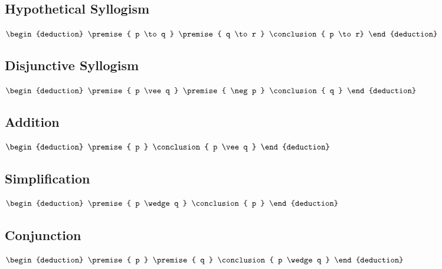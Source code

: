 \documentclass[12pt letter]{report}
\begin{document}
\subsection{Hypothetical Syllogism}

\begin{math}
  \begin{deduction}
    \premise{ p \to q }
    \premise{ q \to r }
    \conclusion{ p \to  r}
  \end{deduction}
\end{math}


\subsection{Disjunctive Syllogism}
\begin{math}
  \begin{deduction}
    \premise{ p \vee q }
    \premise{ \neg  p }
    \conclusion{ q }
  \end{deduction}
\end{math}

\subsection{Addition}
\begin{math}
  \begin{deduction}
    \premise{ p }
    \conclusion{ p \vee  q }
  \end{deduction}
\end{math}

\subsection{Simplification}
\begin{math}
  \begin{deduction}
    \premise{ p \wedge q }
    \conclusion{ p }
  \end{deduction}
\end{math}

\subsection{Conjunction}
\begin{math}
  \begin{deduction}
    \premise{ p }
    \premise{ q }
    \conclusion{ p \wedge q }
  \end{deduction}
\end{math}
\end{document}
